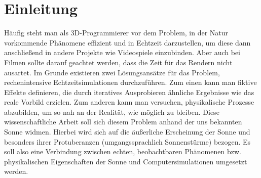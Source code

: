\section{Einleitung}
Häufig steht man als 3D-Programmierer vor dem Problem, in der Natur vorkommende
Phänomene effizient und in Echtzeit darzustellen, um diese dann anschließend in
andere Projekte wie Videospiele einzubinden. Aber auch bei Filmen sollte darauf
geachtet werden, dass die Zeit für das Rendern nicht ausartet. Im Grunde
existieren zwei Lösungsansätze für das Problem, rechenintensive
Echtzeitsimulationen durchzuführen. Zum einen kann man fiktive Effekte
definieren, die durch iteratives Ausprobieren ähnliche Ergebnisse wie das reale
Vorbild erzielen. Zum anderen kann man versuchen, physikalische Prozesse
abzubilden, um so nah an der Realität, wie möglich zu bleiben. Diese
wissenschaftliche Arbeit soll sich diesem Problem anhand der uns bekannten Sonne
widmen. Hierbei wird sich auf die äußerliche Erscheinung der Sonne und besonders
ihrer Protuberanzen (umgangssprachlich Sonnenstürme) bezogen. Es soll also eine
Verbindung zwischen echten, beobachtbaren Phänomenen bzw. physikalischen
Eigenschaften der Sonne und Computersimulationen umgesetzt werden.
